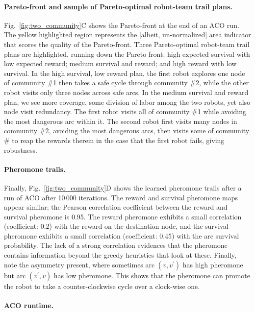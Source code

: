 \documentclass[fleqn,10pt,lineno]{wlpeerj}
\begin{document}
\paragraph{Pareto-front and sample of Pareto-optimal robot-team trail plans.}
Fig.~\ref{fig:two_community}C shows the Pareto-front at the end of an ACO run. The yellow highlighted region represents the [albeit, un-normalized] area indicator that scores the quality of the Pareto-front. Three Pareto-optimal robot-team trail plans are highlighted, running down the Pareto front: high expected survival with low expected reward; medium survival and reward; and high reward with low survival. In the high survival, low reward plan, the first robot explores one node of community \#1 then takes a safe cycle through community \#2, while the other robot visits only three nodes across safe arcs.
In the medium survival and reward plan, we see more coverage, some division of labor among the two robots, yet also node visit redundancy. The first robot visits all of community \#1 while avoiding the most dangerous arc within it. 
The second robot first visits many nodes in community \#2, avoiding the most dangerous arcs, then visits some of community \# to reap the rewards therein in the case that the first robot fails, giving robustness.

\paragraph{Pheromone trails.}
Finally, Fig.~\ref{fig:two_community}D shows the learned pheromone trails after a run of ACO after 10\,000 iterations.
The reward and survival pheromone maps appear similar; the Pearson correlation coefficient between the reward and survival pheromone is 0.95. 
The reward pheromone exhibits a small correlation (coefficient: 0.2) with the reward on the destination node, and the survival pheromone exhibits a small correlation (coefficient: 0.45) with the arc survival probability. The lack of a strong correlation evidences that the pheromone contains information beyond the greedy heuristics that look at these.
Finally, note the asymmetry present, where sometimes arc $(v, v^\prime)$ has high pheromone but arc $(v^\prime, v)$ has low pheromone. This shows that the pheromone can promote the robot to take a counter-clockwise cycle over a clock-wise one.

\paragraph{ACO runtime.}
\end{document}
